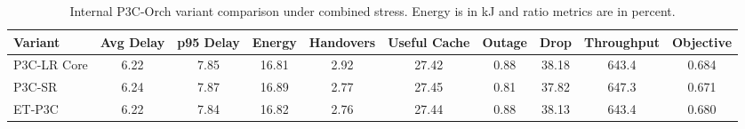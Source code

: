 \begin{table}[!t]
\centering
\caption{Internal P3C-Orch variant comparison under combined stress. Energy is in kJ and ratio metrics are in percent.}
\label{tab:internal_variant}
\scriptsize
\begin{tabular}{lccccccccc}
\toprule
Variant & Avg Delay & p95 Delay & Energy & Handovers & Useful Cache & Outage & Drop & Throughput & Objective \\
\midrule
P3C-LR Core & 6.22 & 7.85 & 16.81 & 2.92 & 27.42 & 0.88 & 38.18 & 643.4 & 0.684 \\
P3C-SR & 6.24 & 7.87 & 16.89 & 2.77 & 27.45 & 0.81 & 37.82 & 647.3 & 0.671 \\
ET-P3C & 6.22 & 7.84 & 16.82 & 2.76 & 27.44 & 0.88 & 38.13 & 643.4 & 0.680 \\
\bottomrule
\end{tabular}
\end{table}
